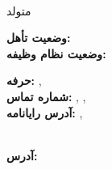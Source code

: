 \documentclass{./../lib/curriculumVitae}
\begin{document}
\iftoggle{Dev}{\par}{}
\parbox{36mm}
{\parbox{36mm}{\raggedleft\Huge\bfseries\color{cyan}\fullName}\\\parbox{36mm}{\centering متولد \bornData}}\quad\parbox{39mm}
{\textbf{وضعیت تأهل:} \maritalStatus\\\textbf{وضعیت نظام وظیفه:} \militaryService}\quad\parbox{99mm}
{\textbf{حرفه:} \ProfessionI, \ProfessionII\\\textbf{شماره تماس:} \mobilePhoneI, \mobilePhoneII, \phoneNumber\\\textbf{آدرس رایانامه:} \emailI, \emailII}\\
\textbf{آدرس:} \fullAddress\\

\descriptions

\education

\workExperience

\teaching

\project

\publication

\LicensesCertifications

\honorsAwards

\training

\languageS

\craft

\voluntary
\end{document}
